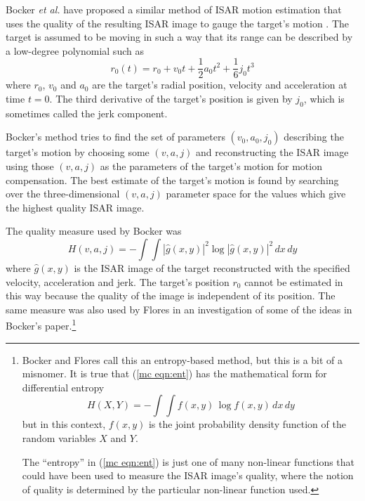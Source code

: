 Bocker {\em et al.\/} have proposed a similar method of ISAR motion
estimation that uses the quality of the resulting ISAR image to gauge the
target's motion \cite{Boc91}.  The target is assumed to be moving in such a
way that its range can be described by a low-degree polynomial such as
\begin{equation}
r_0(t)=r_0+v_0t+\frac{1}{2}a_0t^2+\frac{1}{6}j_0t^3
\end{equation}
where $r_0$, $v_0$ and $a_0$ are the target's radial position, velocity and
acceleration at time $t=0$.  The third derivative of the target's position
is given by $j_0$, which is sometimes called the jerk component.

Bocker's method tries to find the set of parameters $(v_0,a_0,j_0)$
describing the target's motion by choosing some $(v,a,j)$ and
reconstructing the ISAR image using those $(v,a,j)$ as the parameters of
the target's motion for motion compensation.  The best estimate of the
target's motion is found by searching over the three-dimensional $(v,a,j)$
parameter space for the values which give the highest quality ISAR image.

The quality measure used by Bocker was
\begin{equation}
\label{mc eqn:ent}
H(v,a,j)=-\int\!\!\int \left|\widehat{g}(x,y)\right|^2
\log\left|\widehat{g}(x,y)\right|^2\,dx\,dy
\end{equation}
where $\widehat{g}(x,y)$ is the ISAR image of the target reconstructed with
the specified velocity, acceleration and jerk.  The target's position $r_0$
cannot be estimated in this way because the quality of the image is
independent of its position.  The same measure was also used by Flores
\cite{Flo90} in an investigation of some of the ideas in Bocker's
paper.\footnote{Bocker and Flores call this an entropy-based method, but
this is a bit of a misnomer. 
It is true that (\protect\ref{mc eqn:ent}) has the mathematical form for
differential entropy
$$H(X,Y)=-\int\!\!\int f(x,y)\,\log f(x,y)\, dx\, dy$$
but in this context, $f(x,y)$ is the joint probability density function of
the random variables $X$ and $Y$.  

The ``entropy'' in (\protect\ref{mc eqn:ent}) is just one of many non-linear
functions that could have been used to measure the ISAR image's quality,
where the notion of quality is determined by the particular non-linear 
function used.}

